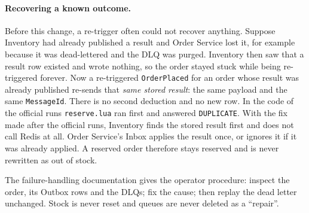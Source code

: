 \documentclass[a4paper]{report}
\begin{document}
\paragraph{Recovering a known outcome.} Before this change, a re-trigger often
could not recover anything. Suppose Inventory had already published a result
and Order Service lost it, for example because it was dead-lettered and the
DLQ was purged. Inventory then saw that a result row existed and wrote
nothing, so the order stayed stuck while being re-triggered forever. Now a
re-triggered \texttt{OrderPlaced} for an order whose result was already
published re-sends that \emph{same stored result}: the same payload and the
same \texttt{MessageId}. There is no second deduction and no new row. In
the code of the official runs \texttt{reserve.lua} ran first and answered
\texttt{DUPLICATE}. With the fix made after the official runs, Inventory finds the stored
result first and does not call Redis at all. Order
Service's Inbox applies the result once, or ignores it if it was already
applied. A reserved order therefore stays reserved and is never rewritten as
out of stock.

The failure-handling documentation gives the operator procedure: inspect the
order, its Outbox rows and the DLQs; fix the cause; then replay the dead
letter unchanged. Stock is never reset and queues are never deleted as a
``repair''.
\end{document}
